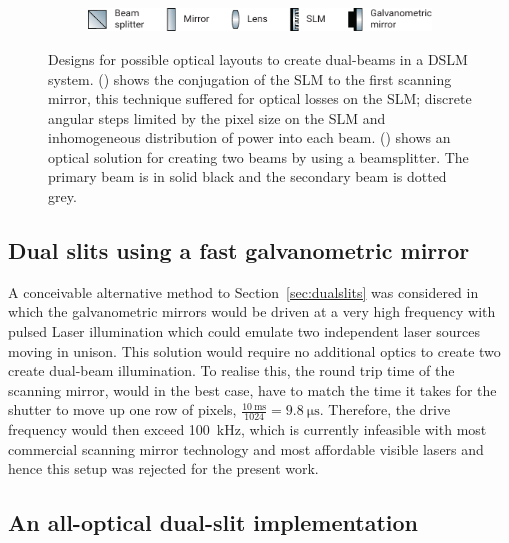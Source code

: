 \begin{figure}
    \vspace{\abovecaptionskip}
    \begin{subfigure}[t]{\textwidth}
        \centering
         \includegraphics{dual_beam_layout/key}
    \end{subfigure}
    \caption[Designs for each optical layout to create dual-beams in a light sheet system]{
    Designs for possible optical layouts to create dual-beams in a \gls{DSLM} system.
    () shows the conjugation of the \gls{SLM} to the first scanning mirror, this technique suffered for optical losses on the \gls{SLM}; discrete angular steps limited by the pixel size on the \gls{SLM} and inhomogeneous distribution of power into each beam.
    () shows an optical solution for creating two beams by using a beamsplitter.
    The primary beam is in solid black and the secondary beam is dotted grey.
    }\label{fig:dual_beam_layouts}
\end{figure}

\subsection{Dual slits using a fast galvanometric mirror}

A conceivable alternative method to Section~\ref{sec:dualslits} was considered in which
the galvanometric mirrors would be driven at a very high frequency with pulsed \gls{Laser} illumination which
could emulate two independent laser sources moving in unison.
This solution would require no additional optics to create two create dual-beam illumination.
To realise this, the round trip time of the scanning mirror, would in the best case, have to match the time it takes for the shutter to move up one row of pixels, \(\frac{\SI{10}{\milli\second}}{1024}=\SI{9.8}{\micro\second}\).
Therefore, the drive frequency would then exceed \SI{100}{\kilo\hertz}, which is currently infeasible with most commercial scanning mirror technology and most affordable visible lasers and hence this setup was rejected for the present work.

\subsection{An all-optical dual-slit implementation}

